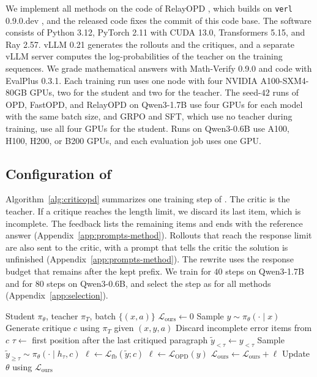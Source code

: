 We implement all methods on the code of RelayOPD \citep{xu2026relay}, which
builds on \texttt{verl} 0.9.0.dev \citep{sheng2025hybridflow}, and the released
code fixes the commit of this code base.
The software consists of Python 3.12, PyTorch 2.11 with CUDA 13.0,
Transformers 5.15, and Ray 2.57.
vLLM 0.21 \citep{kwon2023vllm} generates the rollouts and the critiques, and a
separate vLLM server computes the log-probabilities of the teacher on the
training sequences.
We grade mathematical answers with Math-Verify 0.9.0 and code with EvalPlus
0.3.1.
Each training run uses one node with four NVIDIA A100-SXM4-80GB GPUs, two for
the student and two for the teacher.
The seed-$42$ runs of OPD, FastOPD, and RelayOPD on Qwen3-1.7B use four GPUs
for each model with the same batch size, and GRPO and SFT, which use no
teacher during training, use all four GPUs for the student.
Runs on Qwen3-0.6B use A100, H100, H200, or B200 GPUs, and each evaluation job
uses one GPU.

\subsection{Configuration of \ours{}}
\label{app:config}

Algorithm~\ref{alg:criticopd} summarizes one training step of \ours{}.
The critic is the teacher.
If a critique reaches the length limit, we discard its last item, which is
incomplete.
The feedback lists the remaining items and ends with the reference answer
(Appendix~\ref{app:prompts-method}).
Rollouts that reach the response limit are also sent to the critic, with a
prompt that tells the critic the solution is unfinished
(Appendix~\ref{app:prompts-method}).
The rewrite uses the response budget that remains after the kept prefix.
We train \ours{} for $40$ steps on Qwen3-1.7B and for $80$ steps on Qwen3-0.6B,
and select the step as for all methods (Appendix~\ref{app:selection}).

\begin{algorithm}[t]
\caption{CriticOPD Training}
\label{alg:criticopd}
\begin{algorithmic}[1]
\Require Student $\pi_\theta$, teacher $\pi_T$,
batch $\{(x,a)\}$
\State $\mathcal{L}_{\mathrm{ours}} \gets 0$
    \State Sample $y \sim \pi_\theta(\cdot\mid x)$
        \State Generate critique $c$ using $\pi_T$ given $(x,y,a)$
        \State Discard incomplete error items from $c$
    \EndIf
        \State $\tau \gets$ first position after the last critiqued paragraph
        \State $\tilde{y}_{<\tau} \gets y_{<\tau}$
        \State Sample $\tilde{y}_{\geq\tau}
        \sim \pi_\theta(\cdot\mid h_\tau,c)$
        \State $\ell \gets \mathcal{L}_{\mathrm{fb}}(\tilde{y};c)$
    \Else
        \State $\ell \gets \mathcal{L}_{\mathrm{OPD}}(y)$
    \EndIf
    \State $\mathcal{L}_{\mathrm{ours}}
    \gets \mathcal{L}_{\mathrm{ours}}+\ell$
\EndFor
\State Update $\theta$ using $\mathcal{L}_{\mathrm{ours}}$
\end{algorithmic}
\end{algorithm}

